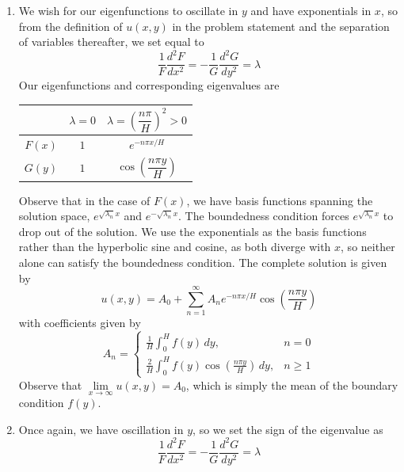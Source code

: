 \documentclass[a4paper]{article}
\begin{document}
\begin{enumerate}[label=(\alph*)]
	\item We wish for our eigenfunctions to oscillate in \( y \) and have exponentials in \( x \), so from the definition of \( u \!\left( x,y \right) \) in the problem statement and the separation of variables thereafter, we set equal to
	\[
		\frac{1}{F}\frac{d^2 F}{d x^2} = -\frac{1}{G}\frac{d^2 G}{d y^2} = \lambda 
	\]
	Our eigenfunctions and corresponding eigenvalues are
	\begin{center}
		\renewcommand{\arraystretch}{1.8}
		\setlength{\arraycolsep}{10pt}
		\begin{tabular}{|c||c|c|}
			\hline
			\rule[-1.2em]{0pt}{3em}
			 & \( \lambda = 0 \) & \( \lambda = \left( \dfrac{n \pi}{H} \right)^{2} > 0 \) \\
			\hline\hline
			\rule[-1.2em]{0pt}{3em}
			\( F \!\left( x \right) \) & \( 1 \) & \( e^{-n \pi x / H} \) \\
			\hline
			\rule[-1.2em]{0pt}{3em}
			\( G \!\left( y \right) \) & \( 1 \) & \( \cos\!\left(\dfrac{n \pi y}{H}\right) \) \\
			\hline
		\end{tabular}
	\end{center}
	Observe that in the case of \( F \!\left( x \right) \), we have basis functions spanning the solution space, \( e^{\sqrt{\lambda_{n}}x} \) and \( e^{-\sqrt{\lambda_{n}}x} \). The boundedness condition forces \( e^{\sqrt{\lambda_{n}}x} \) to drop out of the solution. We use the exponentials as the basis functions rather than the hyperbolic sine and cosine, as both diverge with \( x \), so neither alone can satisfy the boundedness condition. The complete solution is given by
	\[
		u \!\left( x,y \right) = A_{0} + \sum^{\infty}_{n=1} A_{n}e^{-n \pi x / H} \cos\!\left(\frac{n \pi y}{H}\right)
	\]
	with coefficients given by
	\[
		A_{n} = \begin{cases}
			\displaystyle{\frac{1}{H}\int^{H}_{0} f \!\left( y \right) \, dy}, & n = 0 \\[10pt]
			\displaystyle{\frac{2}{H}\int^{H}_{0} f \!\left( y \right)\cos\!\left(\frac{n \pi y}{H}\right) \, dy}, & n \ge 1 
		\end{cases} 
	\]
	Observe that \( \lim\limits_{x \to \infty} u \!\left( x,y \right) = A_{0} \), which is simply the mean of the boundary condition \( f \!\left( y \right) \).
	\item Once again, we have oscillation in \( y \), so we set the sign of the eigenvalue as 
	\[
		\frac{1}{F}\frac{d^2 F}{d x^2} = -\frac{1}{G}\frac{d^2 G}{d y^2} = \lambda 
\]
\end{enumerate}
\end{document}
